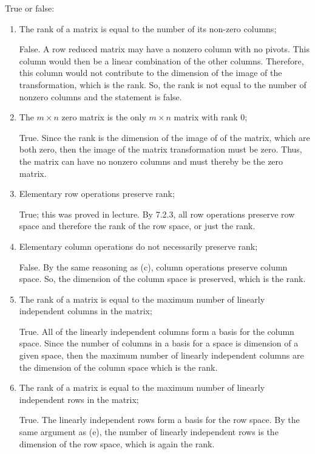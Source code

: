 \documentclass{article}
\begin{document}
True or false:
\begin{enumerate}[label=(\alph*)]
  \item The rank of a matrix is equal to the number of its non-zero columns;

    False. A row reduced matrix may have a nonzero column with no pivots. This column would then be a linear combination of the other columns. Therefore, this column would not contribute to the dimension of the image of the transformation, which is the rank. So, the rank is not equal to the number of nonzero columns and the statement is false.

  \item The $m\times n$ zero matrix is the only $m\times n$ matrix with rank 0;

    True. Since the rank is the dimension of the image of of the matrix, which are both zero, then the image of the matrix transformation must be zero. Thus, the matrix can have no nonzero columns and must thereby be the zero matrix.

  \item Elementary row operations preserve rank;

    True; this was proved in lecture. By 7.2.3, all row operations preserve row space and therefore the rank of the row space, or just the rank.

  \item Elementary column operations do not necessarily preserve rank;

    False. By the same reasoning as (c), column operations preserve column space. So, the dimension of the column space is preserved, which is the rank.

  \item The rank of a matrix is equal to the maximum number of linearly independent columns in the matrix;

    True. All of the linearly independent columns form a basis for the column space. Since the number of columns in a basis for a space is dimension of a given space, then the maximum number of linearly independent columns are the dimension of the column space which is the rank.

  \item The rank of a matrix is equal to the maximum number of linearly independent rows in the matrix;

    True. The linearly independent rows form a basis for the row space. By the same argument as (e), the number of linearly independent rows is the dimension of the row space, which is again the rank.


\end{enumerate}
\end{document}
